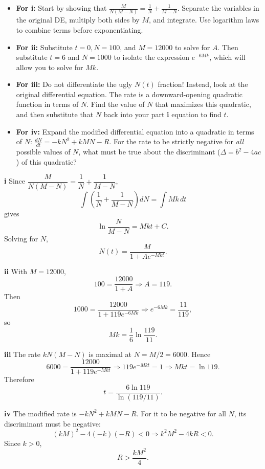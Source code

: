 \begin{hint}
\begin{itemize}
    \item \textbf{For i:} Start by showing that $\frac{M}{N(M-N)} = \frac{1}{N} + \frac{1}{M-N}$. Separate the variables in the original DE, multiply both sides by $M$, and integrate. Use logarithm laws to combine terms before exponentiating. 
    \item \textbf{For ii:} Substitute $t=0, N=100$, and $M=12000$ to solve for $A$. Then substitute $t=6$ and $N=1000$ to isolate the expression $e^{-6Mk}$, which will allow you to solve for $Mk$.
    \item \textbf{For iii:} Do not differentiate the ugly $N(t)$ fraction! Instead, look at the original differential equation. The rate is a downward-opening quadratic function in terms of $N$. Find the value of $N$ that maximizes this quadratic, and then substitute that $N$ back into your part \textbf{i} equation to find $t$.
    \item \textbf{For iv:} Expand the modified differential equation into a quadratic in terms of $N$: $\frac{dN}{dt} = -kN^2 + kMN - R$. For the rate to be strictly negative for \textit{all} possible values of $N$, what must be true about the discriminant ($\Delta = b^2 - 4ac$) of this quadratic?
\end{itemize}
\end{hint}

\begin{solution}
\textbf{i} Since $\dfrac{M}{N(M-N)}=\dfrac1N+\dfrac1{M-N}$,
\[
\int\left(\frac1N+\frac1{M-N}\right)dN=\int Mk\,dt
\]
gives
\[
\ln\frac{N}{M-N}=Mkt+C.
\]
Solving for $N$,
\[
\boxed{N(t)=\frac{M}{1+Ae^{-Mkt}}}.
\]

\textbf{ii} With $M=12000$,
\[
100=\frac{12000}{1+A}\Rightarrow A=119.
\]
Then
\[
1000=\frac{12000}{1+119e^{-6Mk}}
\Rightarrow e^{-6Mk}=\frac{11}{119},
\]
so
\[
\boxed{Mk=\frac16\ln\frac{119}{11}}.
\]

\textbf{iii} The rate $kN(M-N)$ is maximal at $N=M/2=6000$. Hence
\[
6000=\frac{12000}{1+119e^{-Mkt}}
\Rightarrow 119e^{-Mkt}=1
\Rightarrow Mkt=\ln 119.
\]
Therefore
\[
\boxed{t=\frac{6\ln 119}{\ln(119/11)}}.
\]

\textbf{iv} The modified rate is $-kN^2+kMN-R$. For it to be negative for all $N$, its discriminant must be negative:
\[
(kM)^2-4(-k)(-R)<0
\Rightarrow k^2M^2-4kR<0.
\]
Since $k>0$,
\[
\boxed{R>\frac{kM^2}{4}}.
\]
\end{solution}


